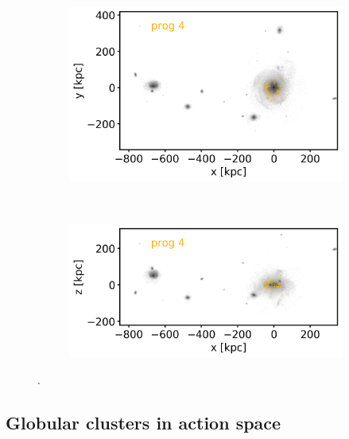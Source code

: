 \begin{figure}[htbp]
    \begin{subfigure}[c]{0.45\textwidth}
    \centering
    	\includegraphics[width=\textwidth]{plots/Dynamics/dist/xy_dist_selected_GCs_prog_4_snap_127.png}
    	\label{fig:prog4_xy}
    \end{subfigure}
    ~ %
    \begin{subfigure}[c]{0.45\textwidth}
        \centering
    	\includegraphics[width=\textwidth]{plots/Dynamics/dist/xz_dist_selected_GCs_prog_4_snap_127.png}
	    \label{fig:prog4_xz}
    \end{subfigure}
    \caption{.}\label{fig:progenitors_distribution}
\end{figure}


\subsection{Globular clusters in action space}
